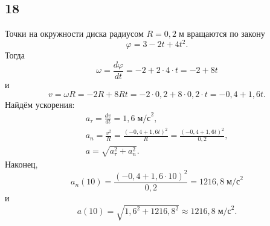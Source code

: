 \subsection{18}

Точки на окружности диска радиусом $R=0{,}2\;\text{м}$ вращаются по закону
\[
\varphi=3-2t+4t^2.
\]
Тогда
\[
\omega=\frac{d\varphi}{dt}=-2+2\cdot4\cdot t=-2+8t
\]
и
\[
v=\omega R=-2R+8Rt=-2\cdot0{,}2+8\cdot0{,}2\cdot t=-0{,}4+1{,}6t.
\]
Найдём ускорения:
\begin{gather*}
a_\tau=\frac{dv}{dt}=1{,}6\;\text{м/с}^2, \\
a_n=\frac{v^2}{R}=\frac{(-0{,}4+1{,}6t)^2}{R}=\frac{(-0{,}4+1{,}6t)^2}{0{,}2}, \\
a=\sqrt{a^2_\tau+a^2_n}.
\end{gather*}
Наконец,
\[
a_n(10)=\frac{(-0{,}4+1{,}6\cdot10)^2}{0{,}2}=1216{,}8\;\text{м/с}^2
\]
и
\[
a(10)=\sqrt{1{,}6^2+1216{,}8^2}\approx1216{,}8\;\text{м/с}^2.
\]